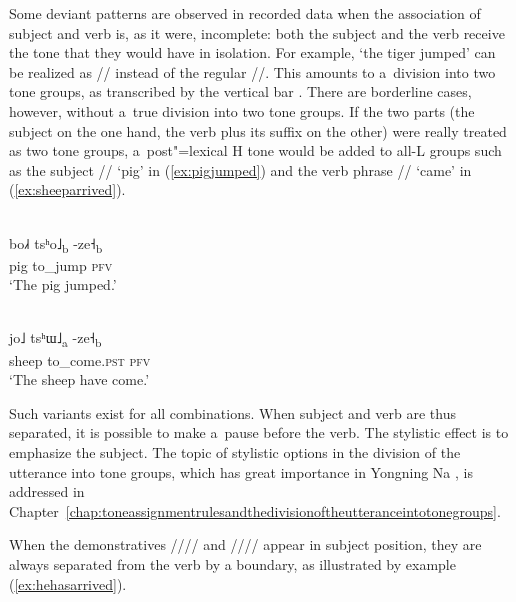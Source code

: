 Some deviant patterns are observed in recorded data when the association of subject and verb is, as
it were, incomplete: both the subject and the verb receive the tone that they would have in
isolation. For example, ‘the tiger jumped’ can be realized as // instead of the regular //. This amounts to a~division into two tone groups, as
transcribed by the vertical bar \ipa{{\kern2pt}|{\kern2pt}}. There are borderline cases, however, without a~true division into
two tone groups. If the two parts (the subject on the one hand, the verb plus its suffix on the other) were really treated as two tone groups, a~post"=lexical H tone would be added to all-L groups such as the subject // ‘pig’ in (\ref{ex:pigjumped}) and the verb phrase
// ‘came’ in (\ref{ex:sheeparrived}).

\begin{exe}
	\ex
	\label{ex:pigjumped}
	\\
	\gll bo˩˧	tsʰo˩\textsubscript{b}	-ze˧\textsubscript{b}\\
	pig		to\_jump		\textsc{pfv}\\
	\glt ‘The pig jumped.’
\end{exe}

\begin{exe}
	\ex
	\label{ex:sheeparrived}
	\\
	\gll jo˩	tsʰɯ˩\textsubscript{a}	-ze˧\textsubscript{b}\\
	sheep		to\_come.\textsc{pst}		\textsc{pfv}\\
	\glt ‘The sheep have come.’
\end{exe}
		
Such variants exist for all combinations. When
subject and verb are thus separated, it is possible to make a~pause before the verb. The stylistic
effect is to emphasize the subject. The topic of stylistic options in the division of the utterance
into tone groups, which has great importance in Yongning Na , is addressed in Chapter~\ref{chap:toneassignmentrulesandthedivisionoftheutteranceintotonegroups}.

When the demonstratives //// and //// appear in subject position, they are always separated from the verb by a  boundary, as illustrated by example (\ref{ex:hehasarrived}).

